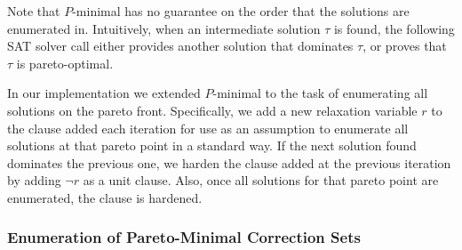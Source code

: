 Note that $P$-minimal has no guarantee on the order that the solutions are enumerated in. 
Intuitively, when an intermediate solution $\tau$ is found, the following SAT solver call either provides another solution that dominates $\tau$, or proves that $\tau$ is pareto-optimal.  

In our implementation we extended $P$-minimal to the task of enumerating all solutions on the pareto front.
Specifically, we add a new relaxation variable $r$ to the clause added each iteration for use as an assumption to enumerate all solutions at that pareto point in a standard way.
If the next solution found dominates the previous one, we harden the clause added at the previous iteration by adding $\lnot r$ as a unit clause.
Also, once all solutions for that pareto point are enumerated, the clause is hardened.

\subsubsection{Enumeration of Pareto-Minimal Correction Sets\label{sec:pareto-mcs}}


